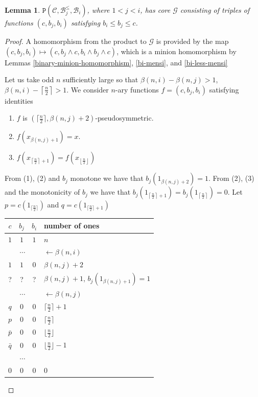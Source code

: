 \documentclass{amsart}
\numberwithin{equation}{section}
\theoremstyle{plain}
\newtheorem{lemma}[theorem]{Lemma}
\theoremstyle{definition}
\def\clone#1{\mathcal{#1}}
\def\minion#1{\mathcal{#1}}
\def\Bc{\clone{B}}
\def\Cc{\clone{C}}
\def\C#1{{\mathtt{P}}(#1)}
\begin{document}
\begin{lemma}\label{cbjbi} $\C{\Cc,\Bc_j^\leq, \Bc_i}$, where $1<j<i$, has core $\minion{G}$ consisting of triples of functions $(c,b_j,b_i)$ satisfying $b_i \leq b_j\leq c $.
\end{lemma}
\begin{proof}
  A homomorphism from the product to $\minion{G}$ is provided by the map $(c,b_j,b_i)\mapsto (c, b_j\wedge c, b_i\wedge b_j\wedge c)$, which is a minion homomorphism
by Lemmas \ref{binary-minion-homomorphism}, \ref{bi-mensi}, and \ref{bi-less-mensi}

Let us take odd $n$ sufficiently large so that $\beta(n,i)-\beta(n,j) > 1$,  $\beta(n,i)-\left\lceil\frac{n}{2}\right\rceil > 1$. 
We consider $n$-ary functions $f = (c,b_j,b_i)$ satisfying identities
\begin{enumerate}
    \item $f$ is $(\lceil\frac{n}{2}\rceil, \beta(n,j)+2)$-pseudosymmetric.
    \item $f(x_{\beta(n,j)+1}) = x$.
    \item $f(x_{\left\lceil\frac{n}{2}\right\rceil +1}) = f(x_{\left\lfloor\frac{n}{2}\right\rfloor})$
\end{enumerate}

From (1), (2) and $b_j$ monotone we have that $b_j(1_{\beta(n,j)+2}) = 1$. From (2), (3) and the monotonicity of $b_j$ we have that $b_j(1_{\left\lceil\frac{n}{2}\right\rceil +1}) = b_j(1_{\left\lceil\frac{n}{2}\right\rceil}) = 0$. Let $p = c(1_{\lceil\frac{n}{2}\rceil})$ and $q = c(1_{\lceil\frac{n}{2}\rceil +1})$

\begin{center}
\begin{tabular}{ |ccc|l } 
 \hline
 $c$ & $b_j$ & $b_i$ & number of ones \\ 
  \hline
     $1$ & $1$ & $1$ & $n$ \\ 
\multicolumn{3}{|c|}{$\cdots$} & \color{gray}$\longleftarrow\beta(n,i)$ \\
     $1$ & $1$ & $0$  &  $\beta(n,j)+2$ \\
    ? & ? & ?  &  $\beta(n,j)+1$, $b_j(1_{\beta(n,j)+1}) = 1$ \\
\multicolumn{3}{|c|}{$\cdots$} & \color{gray}$\longleftarrow\beta(n,j)$ \\
     $q$ & $0$ & $0$ & $\lceil\frac{n}{2}\rceil +1$ \\
     $p$ & $0$ & $0$  & $\lceil\frac{n}{2}\rceil$ \\
     $\bar{p}$ & $0$ & $0$  & $\lfloor\frac{n}{2}\rfloor$ \\
    $\bar{q}$ & $0$ & $0$  & $\lfloor\frac{n}{2}\rfloor-1$ \\
\multicolumn{3}{|c|}{$\cdots$} \\
     $0$ & $0$ & $0$  & $0$\\
 \hline
\end{tabular}
\end{center}


\end{proof}
\end{document}
